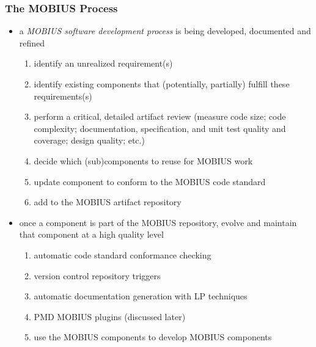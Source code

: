 \documentclass{beamer}
\begin{document}
\begin{frame}\frametitle{The MOBIUS Process}
  \begin{itemize}
  \item a \emph{MOBIUS software development process} is being
    developed, documented and refined
    \begin{enumerate}
    \item identify an unrealized requirement(s)
    \item identify existing components that (potentially, partially)
      fulfill these requirements(s)
    \item perform a critical, detailed artifact review (measure code
      size; code complexity; documentation, specification, and unit
      test quality and coverage; design quality; etc.)
    \item decide which (sub)components to reuse for MOBIUS work
    \item update component to conform to the MOBIUS code standard
    \item add to the MOBIUS artifact repository
    \end{enumerate}
  \item once a component is part of the MOBIUS repository, evolve and
    maintain that component at a high quality level
    \begin{enumerate}
    \item automatic code standard conformance checking
    \item version control repository triggers
    \item automatic documentation generation with LP techniques
    \item PMD MOBIUS plugins (discussed later)
    \item use the MOBIUS components to develop MOBIUS components
    \end{enumerate}
  \end{itemize}
\end{frame}
\end{document}
